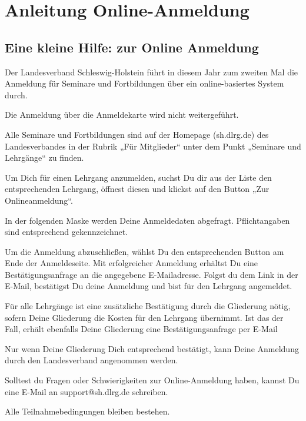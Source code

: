 

\renewcommand\myheadingtext{Gesamtverband | Organisatorisches}

\section*{Anleitung Online-Anmeldung}
\subsection*{Eine kleine Hilfe: zur Online Anmeldung}



Der Landesverband Schleswig-Holstein führt in diesem Jahr zum
zweiten Mal die Anmeldung für Seminare und Fortbildungen über
ein online-basiertes System durch.\newline

Die Anmeldung über die Anmeldekarte wird nicht weitergeführt.\newline

Alle Seminare und Fortbildungen sind auf der Homepage
(sh.dlrg.de) des Landesverbandes in der Rubrik „Für Mitglieder“ unter dem Punkt „Seminare und Lehrgänge“ zu finden. \newline

Um Dich für einen Lehrgang anzumelden, suchst Du dir aus der Liste
den entsprechenden Lehrgang, öffnest diesen und klickst auf den
Button „Zur Onlineanmeldung“.\newline

In der folgenden Maske werden Deine Anmeldedaten abgefragt.
Pflichtangaben sind entsprechend gekennzeichnet.\newline

Um die Anmeldung abzuschließen, wählst Du den entsprechenden
Button am Ende der Anmeldeseite. Mit erfolgreicher Anmeldung erhältst Du eine Bestätigungsanfrage an die angegebene E-Mailadresse. Folgst du dem Link in der E-Mail, bestätigst Du deine Anmeldung
und bist für den Lehrgang angemeldet.\newline

Für alle Lehrgänge ist eine zusätzliche Bestätigung durch die Gliederung nötig, sofern Deine Gliederung die Kosten für den Lehrgang
übernimmt. Ist das der Fall, erhält ebenfalls Deine Gliederung eine
Bestätigungsanfrage per E-Mail\newline

Nur wenn Deine Gliederung Dich entsprechend bestätigt, kann Deine Anmeldung durch den Landesverband angenommen werden.\newline

Solltest du Fragen oder Schwierigkeiten zur Online-Anmeldung haben, kannst Du eine E-Mail an support@sh.dlrg.de schreiben.\newline

Alle Teilnahmebedingungen bleiben bestehen.\newline

\newpage
